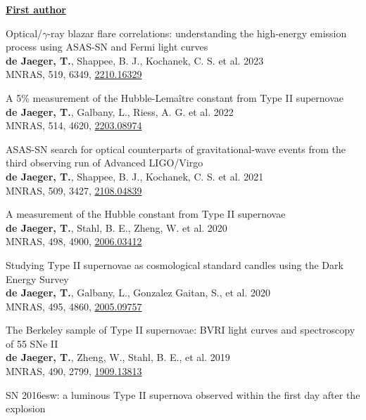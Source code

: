 \documentclass[12pt]{article}
\begin{document}
\vspace{1.8cm}
\underline{\textbf{First author}}
\vspace{0.2cm}
\begin{bibenum}


    \item 
Optical/$\gamma$-ray blazar flare correlations: understanding the high-energy emission process using ASAS-SN and Fermi light curves \\ 
\textbf{de Jaeger, T.}, Shappee, B. J., Kochanek, C. S. et al. 2023\\
MNRAS, 519, 6349, \href{https://arxiv.org/pdf/2210.16329.pdf}{2210.16329}
    \item 
A 5\% measurement of the Hubble-Lema\^itre constant from Type II supernovae\\ 
\textbf{de Jaeger, T.}, Galbany, L., Riess, A. G. et al. 2022\\
MNRAS, 514, 4620, \href{https://arxiv.org/pdf/2203.08974.pdf}{2203.08974}
    \item 
ASAS-SN search for optical counterparts of gravitational-wave events from the third observing run of Advanced LIGO/Virgo\\ 
\textbf{de Jaeger, T.}, Shappee, B. J., Kochanek, C. S. et al. 2021\\
MNRAS, 509, 3427, \href{https://arxiv.org/pdf/2108.04839.pdf}{2108.04839}
    \item 
A measurement of the Hubble constant from Type II supernovae\\
\textbf{de Jaeger, T.}, Stahl, B. E., Zheng, W. et al. 2020\\
MNRAS, 498, 4900, \href{https://arxiv.org/pdf/2006.03412.pdf}{2006.03412}
    \item 
Studying Type II supernovae as cosmological standard candles using the Dark Energy Survey\\
\textbf{de Jaeger, T.}, Galbany, L., Gonzalez Gaitan, S., et al. 2020\\
MNRAS, 495, 4860, \href{https://arxiv.org/pdf/2005.09757.pdf}{2005.09757}
    \item 
The Berkeley sample of Type II supernovae: BVRI light curves and spectroscopy of 55 SNe II\\
\textbf{de Jaeger, T.}, Zheng, W., Stahl, B. E., et al. 2019\\
MNRAS, 490, 2799, \href{https://arxiv.org/pdf/1909.13813.pdf}{1909.13813}
    \item 
SN 2016esw: a luminous Type II supernova observed within the first day after the explosion\\

\end{bibenum}
\end{document}
